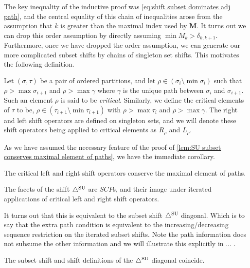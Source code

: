 The key inequality of the inductive proof was \cref{eq:shift subset dominates adj path}, and the central equality of this chain of inequalities arose from the assumption that $k$ is greater than the maximal index used by $\mathbf{M}$. 
It turns out we can drop this order assumption by directly assuming $\min M_k > \delta_{k,k+1}$.
Furthermore, once we have dropped the order assumption, we can generate our more complicated subset shifts by chains of singleton set shifts. This motivates the following definition.

\begin{definition} \label{def:critical SU shift}
Let $(\sigma,\tau)$ be a pair of ordered partitions, and let $\rho \in (\sigma_i \setminus \min \sigma_i)$ such that $\rho>\max \sigma_{i+1}$ and $\rho>\max \gamma$ where $\gamma$ is the unique path between $\sigma_i$ and $\sigma_{i+1}$. Such an element $\rho$ is said to be \emph{critical}. 
Similarly, we define the critical elements of $\tau$ to be, $\rho \in (\tau_{i+1} \setminus \min\tau_{i+1})$ with $\rho > \max \tau_{i}$ and $\rho > \max \gamma$. 
The right and left shift operators are defined on singleton sets, and we will denote these shift operators being applied to critical elements as $R_{\rho}$ and $L_{\rho}$.
\end{definition}

As we have assumed the necessary feature of the proof of \cref{lem:SU subset conserves maximal element of paths}, we have the immediate corollary.

\begin{corollary}
The critical left and right shift operators conserve the maximal element of paths.
\end{corollary}

\begin{definition}
The facets of the shift $\triangle^{\mathrm{SU}}$ are $SCP$s, and their image under iterated applications of critical left and right shift operators.
\end{definition}

It turns out that this is equivalent to the subset shift $\triangle^{\mathrm{SU}}$ diagonal. Which is to say that the extra path condition is equivalent to the increasing/decreasing sequence restriction on the iterated subset shifts. Note the path information does not subsume the other information and we will illustrate this explicitly in ... . 

\begin{proposition}
The subset shift and shift definitions of the $\triangle^{\mathrm{SU}}$ diagonal coincide.
\end{proposition}

